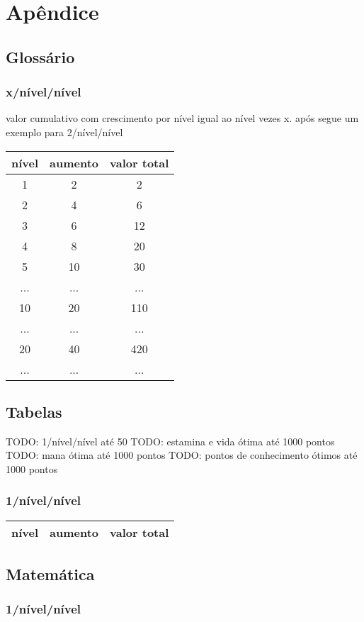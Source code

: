 \part{Apêndice}
\appendix
\chapter{Glossário}
\section{x/nível/nível}
valor cumulativo com crescimento por nível igual ao nível vezes x.
após segue um exemplo para 2/nível/nível

\begin{tabular}[c]{c|c|c}
\hline
  nível & aumento & valor total  \\
\hline
  1   & 2   & 2   \\
  2   & 4   & 6   \\
  3   & 6   & 12  \\
  4   & 8   & 20  \\
  5   & 10  & 30  \\
  ... & ... & ... \\
  10  & 20  & 110 \\ 
  ... & ... & ... \\
  20  & 40  & 420 \\
  ... & ... & ... \\
\hline
\end{tabular}

\chapter{Tabelas}
TODO: 1/nível/nível até 50 
TODO: estamina e vida ótima até 1000 pontos
TODO: mana ótima até 1000 pontos
TODO: pontos de conhecimento ótimos até 1000 pontos
\section{1/nível/nível}
\begin{longtable}{c|c|c}
  \hline
  nível & aumento & valor total \\
  \hline \endhead
\end{longtable}
\chapter{Matemática}
\section{1/nível/nível}
